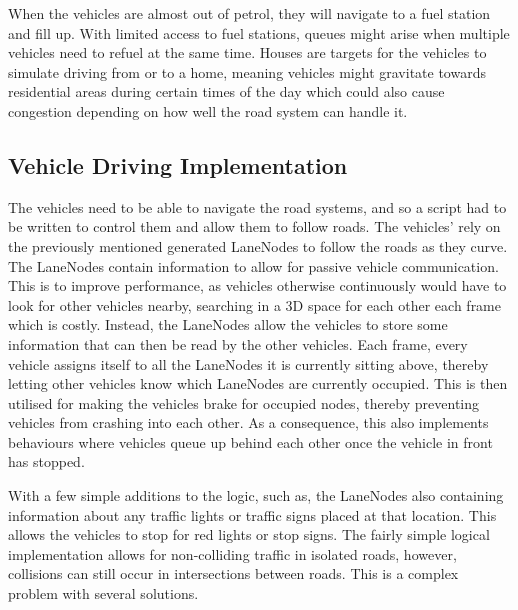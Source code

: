         When the vehicles are almost out of petrol, they will navigate to a fuel station and fill up. With limited access to fuel stations, queues might arise when multiple vehicles need to refuel at the same time. Houses are targets for the vehicles to simulate driving from or to a home, meaning vehicles might gravitate towards residential areas during certain times of the day which could also cause congestion depending on how well the road system can handle it.

    \subsection{Vehicle Driving Implementation}
        The vehicles need to be able to navigate the road systems, and so a script had to be written to control them and allow them to follow roads. The vehicles' rely on the previously mentioned generated LaneNodes to follow the roads as they curve. The LaneNodes contain information to allow for passive vehicle communication. This is to improve performance, as vehicles otherwise continuously would have to look for other vehicles nearby, searching in a 3D space for each other each frame which is costly. Instead, the LaneNodes allow the vehicles to store some information that can then be read by the other vehicles. Each frame, every vehicle assigns itself to all the LaneNodes it is currently sitting above, thereby letting other vehicles know which LaneNodes are currently occupied. This is then utilised for making the vehicles brake for occupied nodes, thereby preventing vehicles from crashing into each other. As a consequence, this also implements behaviours where vehicles queue up behind each other once the vehicle in front has stopped.
    
        With a few simple additions to the logic, such as, the LaneNodes also containing information about any traffic lights or traffic signs placed at that location. This allows the vehicles to stop for red lights or stop signs. The fairly simple logical implementation allows for non-colliding traffic in isolated roads, however, collisions can still occur in intersections between roads. This is a complex problem with several solutions.
    
